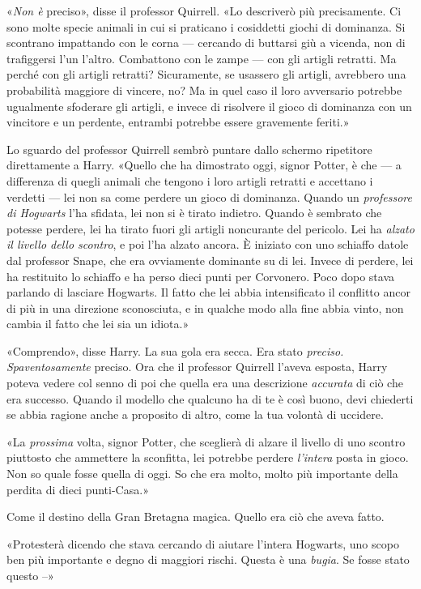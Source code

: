 «\textit{Non è} preciso», disse il professor Quirrell. «Lo descriverò più precisamente. Ci sono molte specie animali in cui si praticano i cosiddetti giochi di dominanza. Si scontrano impattando con le corna — cercando di buttarsi giù a vicenda, non di trafiggersi l’un l’altro. Combattono con le zampe — con gli artigli retratti. Ma perché con gli artigli retratti? Sicuramente, se usassero gli artigli, avrebbero una probabilità maggiore di vincere, no? Ma in quel caso il loro avversario potrebbe ugualmente sfoderare gli artigli, e invece di risolvere il gioco di dominanza con un vincitore e un perdente, entrambi potrebbe essere gravemente feriti.»

Lo sguardo del professor Quirrell sembrò puntare dallo schermo ripetitore direttamente a Harry. «Quello che ha dimostrato oggi, signor Potter, è che — a differenza di quegli animali che tengono i loro artigli retratti e accettano i verdetti — lei non sa come perdere un gioco di dominanza. Quando un \textit{professore di Hogwarts} l’ha sfidata, lei non si è tirato indietro. Quando è sembrato che potesse perdere, lei ha tirato fuori gli artigli noncurante del pericolo. Lei ha \textit{alzato il livello dello scontro}, e poi l’ha alzato ancora. È iniziato con uno schiaffo datole dal professor Snape, che era ovviamente dominante su di lei. Invece di perdere, lei ha restituito lo schiaffo e ha perso dieci punti per Corvonero. Poco dopo stava parlando di lasciare Hogwarts. Il fatto che lei abbia intensificato il conflitto ancor di più in una direzione sconosciuta, e in qualche modo alla fine abbia vinto, non cambia il fatto che lei sia un idiota.»

«Comprendo», disse Harry. La sua gola era secca. Era stato \textit{preciso. Spaventosamente} preciso. Ora che il professor Quirrell l’aveva esposta, Harry poteva vedere col senno di poi che quella era una descrizione \textit{accurata} di ciò che era successo. Quando il modello che qualcuno ha di te è così buono, devi chiederti se abbia ragione anche a proposito di altro, come la tua volontà di uccidere.

«La \textit{prossima} volta, signor Potter, che sceglierà di alzare il livello di uno scontro piuttosto che ammettere la sconfitta, lei potrebbe perdere \textit{l’intera} posta in gioco. Non so quale fosse quella di oggi. So che era molto, molto più importante della perdita di dieci punti-Casa.»

Come il destino della Gran Bretagna magica. Quello era ciò che aveva fatto.

«Protesterà dicendo che stava cercando di aiutare l’intera Hogwarts, uno scopo ben più importante e degno di maggiori rischi. Questa è una \textit{bugia}. Se fosse stato questo –»

